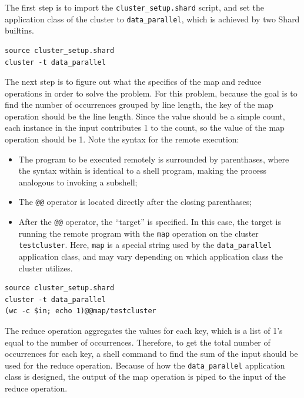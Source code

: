 \documentclass[twoside]{report}
\begin{document}
The first step is to import the \texttt{cluster\_setup.shard} script, and set the application class of the cluster to \texttt{data\_parallel}, which is achieved by two Shard builtins.

\begin{minipage}[c]{\textwidth-15pt}
  \begin{lstlisting}[language=Shard]
source cluster_setup.shard
cluster -t data_parallel
\end{lstlisting}
  \smallskip
\end{minipage}

The next step is to figure out what the specifics of the map and reduce operations in order to solve the problem.
For this problem, because the goal is to find the number of occurrences grouped by line length, the key of the map operation should be the line length.
Since the value should be a simple count, each instance in the input contributes 1 to the count, so the value of the map operation should be 1.
Note the syntax for the remote execution:
\begin{itemize}
  \item The program to be executed remotely is surrounded by parenthases, where the syntax within is identical to a shell program, making the process analogous to invoking a subshell;
  \item The \texttt{@@} operator is located directly after the closing parenthases;
  \item After the \texttt{@@} operator, the ``target'' is specified. In this case, the target is running the remote program with the \texttt{map} operation on the cluster \texttt{testcluster}. Here, \texttt{map} is a special string used by the \texttt{data\_parallel} application class, and may vary depending on which application class the cluster utilizes.
\end{itemize}

\begin{minipage}[c]{\textwidth-15pt}
  \begin{lstlisting}[language=Shard]
source cluster_setup.shard
cluster -t data_parallel
(wc -c $in; echo 1)@@map/testcluster
\end{lstlisting}
  \smallskip
\end{minipage}

The reduce operation aggregates the values for each key, which is a list of 1's equal to the number of occurrences.
Therefore, to get the total number of occurrences for each key, a shell command to find the sum of the input should be used for the reduce operation.
Because of how the \texttt{data\_parallel} application class is designed, the output of the map operation is piped to the input of the reduce operation.
\end{document}
